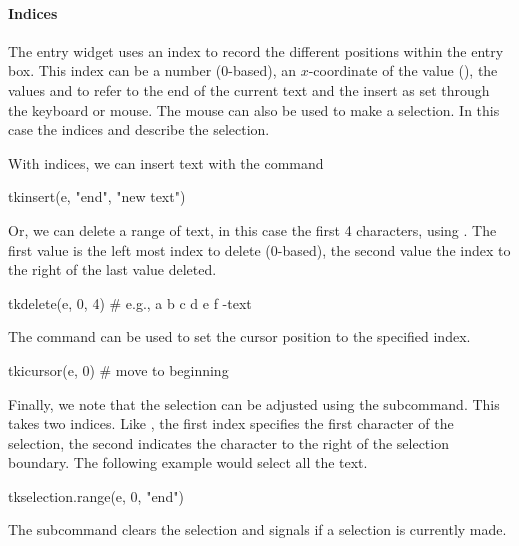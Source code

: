 \paragraph{Indices}
The entry widget uses an index to record the different positions
within the entry box. This index can be a number (0-based), an
$x$-coordinate of the value (), the values  and
 to refer to the end of the current text and the insert
as set through the keyboard or mouse. The mouse can also be used to
make a selection. In this case the indices  and
 describe the selection.

With indices, we can insert  text with the  command
\begin{Schunk}
\begin{Sinput}
 tkinsert(e, "end", "new text")
\end{Sinput}
\end{Schunk}

Or, we can delete a range of text, in this case the first 4
characters, using . The first value is
the left most index to delete (0-based), the second value the index to
the right of the last value deleted.
\begin{Schunk}
\begin{Sinput}
 tkdelete(e, 0, 4) # e.g.,  a b c d e f   -text
\end{Sinput}
\end{Schunk}

The  command can be used to set the
cursor position to the specified index.
\begin{Schunk}
\begin{Sinput}
 tkicursor(e, 0)                         # move to beginning
\end{Sinput}
\end{Schunk}

Finally, we note that the selection can be adjusted using the
 subcommand. This takes two
indices. Like , the first index specifies the first character of
the selection, the second indicates the character to the right of the
selection boundary. The following example would select all the text.
\begin{Schunk}
\begin{Sinput}
 tkselection.range(e, 0, "end")
\end{Sinput}
\end{Schunk}
The  subcommand clears the selection and  signals if a selection is currently made.

